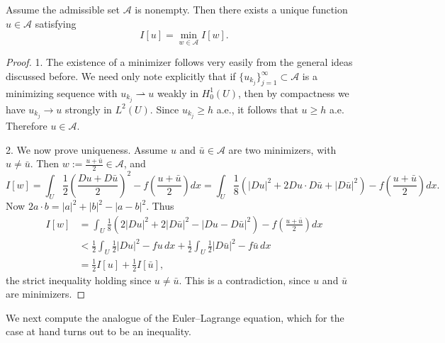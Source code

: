\begin{theorem}
\label{thm:existence-minimizer-obstacle-problem}
Assume the admissible set $\mathcal{A}$ is nonempty. Then there exists a unique function $u \in \mathcal{A}$ satisfying
\[
I[u] = \min_{w \in \mathcal{A}} I[w].
\]
\end{theorem}
\begin{proof}
1. The existence of a minimizer follows very easily from the general ideas discussed before. We need only note explicitly that if $\{u_{k_j}\}_{j=1}^\infty \subset \mathcal{A}$ is a minimizing sequence with $u_{k_j} \rightharpoonup u$ weakly in $H^1_0(U)$, then by compactness we have $u_{k_j} \to u$ strongly in $L^2(U)$. Since $u_{k_j} \geq h$ a.e., it follows that $u \geq h$ a.e. Therefore $u \in \mathcal{A}$.

2. We now prove uniqueness. Assume $u$ and $\bar{u} \in \mathcal{A}$ are two minimizers, with $u \neq \bar{u}$. Then $w := \frac{u+\bar{u}}{2} \in \mathcal{A}$, and
\[
I[w] = \int_U \frac{1}{2}\left(\frac{Du + D\bar{u}}{2}\right)^2 - f\left(\frac{u+\bar{u}}{2}\right) dx = \int_U \frac{1}{8}(|Du|^2 + 2Du \cdot D\bar{u} + |D\bar{u}|^2) - f\left(\frac{u+\bar{u}}{2}\right) dx.
\]
Now $2a \cdot b = |a|^2 + |b|^2 - |a - b|^2$. Thus
\[
\begin{aligned}
I[w] &= \int_U \frac{1}{8}(2|Du|^2 + 2|D\bar{u}|^2 - |Du - D\bar{u}|^2) - f\left(\frac{u+\bar{u}}{2}\right) dx \\
&< \frac{1}{2} \int_U \frac{1}{2}|Du|^2 - fu\, dx + \frac{1}{2} \int_U \frac{1}{2}|D\bar{u}|^2 - f\bar{u}\, dx \\
&= \frac{1}{2}I[u] + \frac{1}{2}I[\bar{u}],
\end{aligned}
\]
the strict inequality holding since $u \neq \bar{u}$. This is a contradiction, since $u$ and $\bar{u}$ are minimizers.
\end{proof}

We next compute the analogue of the Euler--Lagrange equation, which for the case at hand turns out to be an inequality.

